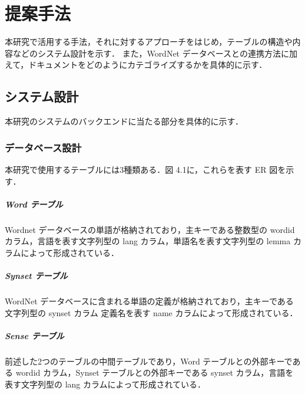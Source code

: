 \chapter{提案手法}
\label{ch:app}
\quad

本研究で活用する手法，それに対するアプローチをはじめ，テーブルの構造や内容などのシステム設計を示す．
また，WordNet データベースとの連携方法に加えて，ドキュメントをどのようにカテゴライズするかを具体的に示す．

\section{システム設計}
\label{sec:app_design}
本研究のシステムのバックエンドに当たる部分を具体的に示す．
\subsection{データベース設計}
\label{subsec:table}

本研究で使用するテーブルには3種類ある．図 4.1に，これらを表す ER 図を示す．

\paragraph{Word テーブル}
Wordnet データベースの単語が格納されており，主キーである整数型の wordid カラム，言語を表す文字列型の lang カラム，単語名を表す文字列型の lemma カラムによって形成されている．

\paragraph{Synset テーブル}
WordNet データベースに含まれる単語の定義が格納されており，主キーである文字列型の synset カラム 定義名を表す name カラムによって形成されている．

\paragraph{Sense テーブル}
前述した2つのテーブルの中間テーブルであり，Word テーブルとの外部キーである wordid カラム，Synset テーブルとの外部キーである synset カラム，言語を表す文字列型の lang カラムによって形成されている．

\clearpage

